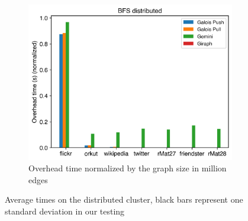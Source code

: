 \begin{figure}
\begin{subfigure}{0.3\textwidth}
		\includegraphics[width=\linewidth]{../../plots/distributedBFS_overheadTimeNormalized.png}
		\caption{Overhead time normalized by the graph size in million edges}
		\label{fig:distributedBFS_overheadNormalized}
	\end{subfigure}
	
	\caption{Average times on the distributed cluster, black bars represent one standard deviation in our testing}
\end{figure}
